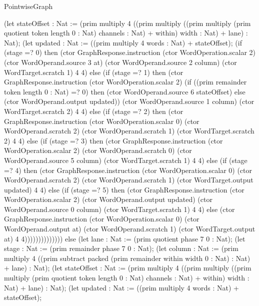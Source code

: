 \begin{lexlean}{PointwiseGraph}
\begin{semanticmodule}
{      (let stateOffset : Nat := (prim multiply 4 ((prim multiply ((prim multiply (prim quotient token length 0 : Nat) channels : Nat) + within) width : Nat) + lane) : Nat);
      (let updated : Nat := ((prim multiply 4 words : Nat) + stateOffset);
      (if (stage =? 0) then (ctor GraphResponse.instruction (ctor WordOperation.scalar 2) (ctor WordOperand.source 3 at) (ctor WordOperand.source 2 column) (ctor WordTarget.scratch 1) 4 4) else (if (stage =? 1) then (ctor GraphResponse.instruction (ctor WordOperation.scalar 2) (if ((prim remainder token length 0 : Nat) =? 0) then (ctor WordOperand.source 6 stateOffset) else (ctor WordOperand.output updated)) (ctor WordOperand.source 1 column) (ctor WordTarget.scratch 2) 4 4) else (if (stage =? 2) then (ctor GraphResponse.instruction (ctor WordOperation.scalar 0) (ctor WordOperand.scratch 2) (ctor WordOperand.scratch 1) (ctor WordTarget.scratch 2) 4 4) else (if (stage =? 3) then (ctor GraphResponse.instruction (ctor WordOperation.scalar 2) (ctor WordOperand.scratch 0) (ctor WordOperand.source 5 column) (ctor WordTarget.scratch 1) 4 4) else (if (stage =? 4) then (ctor GraphResponse.instruction (ctor WordOperation.scalar 0) (ctor WordOperand.scratch 2) (ctor WordOperand.scratch 1) (ctor WordTarget.output updated) 4 4) else (if (stage =? 5) then (ctor GraphResponse.instruction (ctor WordOperation.scalar 2) (ctor WordOperand.output updated) (ctor WordOperand.source 0 column) (ctor WordTarget.scratch 1) 4 4) else (ctor GraphResponse.instruction (ctor WordOperation.scalar 0) (ctor WordOperand.output at) (ctor WordOperand.scratch 1) (ctor WordTarget.output at) 4 4)))))))))))))) else (let lane : Nat := (prim quotient phase 7 0 : Nat);
      (let stage : Nat := (prim remainder phase 7 0 : Nat);
      (let column : Nat := (prim multiply 4 ((prim subtract packed (prim remainder within width 0 : Nat) : Nat) + lane) : Nat);
      (let stateOffset : Nat := (prim multiply 4 ((prim multiply ((prim multiply (prim quotient token length 0 : Nat) channels : Nat) + within) width : Nat) + lane) : Nat);
      (let updated : Nat := ((prim multiply 4 words : Nat) + stateOffset);
}
\end{semanticmodule}
\end{lexlean}
